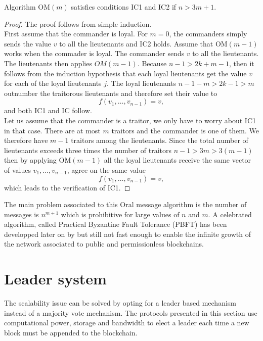 \begin{theo}
Algorithm $\text{OM}(m)$ satisfies conditions IC1 and IC2 if $n>3m+1$.
\end{theo}
\begin{proof}
The proof follows from simple induction.\\

\noindent First assume that the commander is loyal. For $m = 0$, the commanders simply sends the value $v$ to all the lieutenants and IC2 holds. Assume that $\text{OM}(m-1)$ works when the commader is loyal. The commander sends $v$ to all the lieutenants. The lieutenants then applies $OM(m-1)$. Because $n-1>2k + m-1$, then it follows from the induction hypothesis that each loyal lieutenants get the value $v$ for each of the loyal lieutenants $j$. The loyal lieutenants $n-1-m > 2k-1>m $ outnumber the traitorous lieutenants and therefore set their value to 
$$
f(v_1,\ldots, v_{n-1}) = v,
$$  
and both IC1 and IC follow.\\

\noindent Let us assume that the commander is a traitor, we only have to worry about IC1 in that case. There are at most $m$ traitors and the commander is one of them. We therefore have $m-1$ traitors among the lieutenants. Since the total number of lieutenants exceeds three times the number of traitors $n-1>3m>3(m-1)$ then by applying $\text{OM}(m-1)$ all the loyal lieutenants receive the same vector of values $v_1,\ldots, v_{n-1}$, agree on the same value 
$$
f(v_1,\ldots,v_{n-1}) =v,
$$
which leads to the verification of IC1.
\end{proof}
The main problem associated to this Oral message algorithm is the number of messages is $n^{m+1}$ which is prohibitive for large values of $n$ and $m$. A celebrated algorithm, called Practical Byzantine Fault Tolerance (PBFT) has been developped later on by \citet{10.5555/296806.296824} but still not fast enough to enable the infinite growth of the network associated to public and permissionless blockchains.
\section{Leader system}\label{sec:leader}
The scalability issue can be solved by opting for a leader based mechanism instead of a majority vote mechanism. The protocols presented in this section use computational power, storage and bandwidth to elect a leader each time a new block must be appended to the blockchain.   
